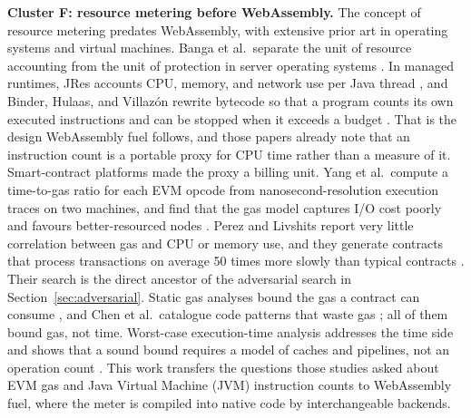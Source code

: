 \documentclass{ws-jcsc}
\begin{document}
\textbf{Cluster F: resource metering before WebAssembly.} The concept of resource metering predates WebAssembly, with extensive prior art in operating systems and virtual machines. Banga et al.\ separate the unit of resource accounting from the unit of protection in server operating systems \cite{banga1999resource}. In managed runtimes, JRes accounts CPU, memory, and network use per Java thread \cite{czajkowski1998jres}, and Binder, Hulaas, and Villaz\'on rewrite bytecode so that a program counts its own executed instructions and can be stopped when it exceeds a budget \cite{binder2001portable, hulaas2004program}. That is the design WebAssembly fuel follows, and those papers already note that an instruction count is a portable proxy for CPU time rather than a measure of it. Smart-contract platforms made the proxy a billing unit. Yang et al.\ compute a time-to-gas ratio for each EVM opcode from nanosecond-resolution execution traces on two machines, and find that the gas model captures I/O cost poorly and favours better-resourced nodes \cite{yang2019empirically}. Perez and Livshits report very little correlation between gas and CPU or memory use, and they generate contracts that process transactions on average 50 times more slowly than typical contracts \cite{perez2020broken}. Their search is the direct ancestor of the adversarial search in Section~\ref{sec:adversarial}. Static gas analyses bound the gas a contract can consume \cite{albert2019fumes, das2020exact, grech2018madmax}, and Chen et al.\ catalogue code patterns that waste gas \cite{chen2017underoptimized}; all of them bound gas, not time. Worst-case execution-time analysis addresses the time side and shows that a sound bound requires a model of caches and pipelines, not an operation count \cite{wilhelm2008wcet}. This work transfers the questions those studies asked about EVM gas and Java Virtual Machine (JVM) instruction counts to WebAssembly fuel, where the meter is compiled into native code by interchangeable backends.
\end{document}
